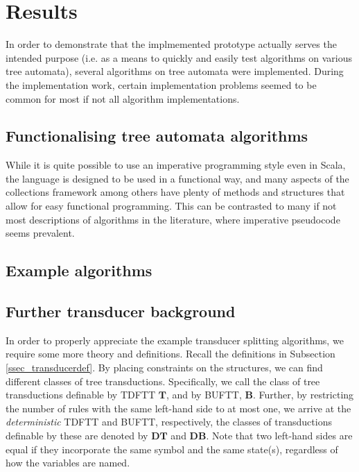 \section{Results}

In order to demonstrate that the implmemented prototype actually serves the
intended purpose (i.e. as a means to quickly and easily test algorithms on
various tree automata), several algorithms on tree automata were
implemented. During the implementation work, certain implementation
problems seemed to be common for most if not all algorithm implementations. 

\subsection{Functionalising tree automata algorithms}

While it is quite possible to use an imperative programming style even in
Scala, the language is designed to be used in a functional way, and many
aspects of the collections framework among others have plenty of methods
and structures that allow for easy functional programming. This can be
contrasted to many if not most descriptions of algorithms in the
literature, where imperative pseudocode seems prevalent.

\subsection{Example algorithms}

\subsection{Further transducer background}

In order to properly appreciate the example transducer splitting
algorithms, we require some more theory and definitions. Recall the
definitions in Subsection \ref{ssec_transducerdef}. By placing constraints
on the structures, we can find different classes of tree transductions.
Specifically, we call the class of tree transductions definable by TDFTT
$\mathbf{T}$, and by BUFTT, $\mathbf{B}$. Further, by restricting the
number of rules with the same left-hand side to at most one, we arrive at
the \emph{deterministic} TDFTT and BUFTT, respectively, the classes of
transductions definable by these are denoted by $\mathbf{DT}$ and
$\mathbf{DB}$. Note that two left-hand sides are equal if they incorporate
the same symbol and the same state(s), regardless of how the variables are
named.

